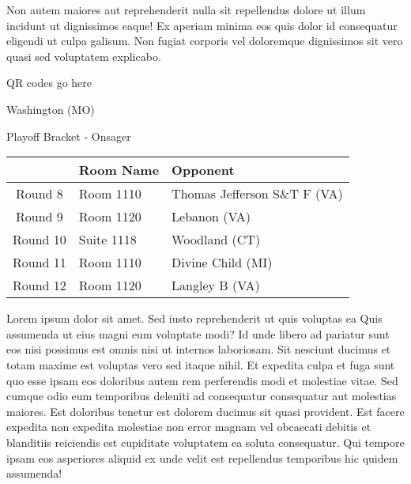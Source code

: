 \documentclass{article}%
\begin{document}
\newline%
Non autem maiores aut reprehenderit nulla sit repellendus dolore ut illum incidunt ut dignissimos eaque! Ex aperiam minima eos quis dolor id consequatur eligendi ut culpa galisum. Non fugiat corporis vel doloremque dignissimos sit vero quasi sed voluptatem explicabo.\newline%
\newline%
%
\vspace*{30pt}%
\begin{center}%
\begin{Huge}%
QR codes go here%
\end{Huge}%
\end{center}%
\newpage%
\begin{center}%
\begin{Huge}%
Washington (MO)%
\end{Huge}%
\vspace*{8pt}%
\linebreak%
\begin{Large}%
Playoff Bracket {-} Onsager%
\end{Large}%
\end{center}%
\begin{tabularx}{\textwidth}{|c|Y|Y|}%
\hline%
&Room Name&Opponent\\%
\hline%
Round 8&Room 1110&Thomas Jefferson S\&T F (VA)\\%
Round 9&Room 1120&Lebanon (VA)\\%
Round 10&Suite 1118&Woodland (CT)\\%
Round 11&Room 1110&Divine Child (MI)\\%
Round 12&Room 1120&Langley B (VA)\\%
\hline%
\end{tabularx}%
\vspace*{8pt}%
\linebreak%
\newline%
\newline%
Lorem ipsum dolor sit amet. Sed iusto reprehenderit ut quis voluptas ea Quis assumenda ut eius magni eum voluptate modi? Id unde libero ad pariatur sunt eos nisi possimus est omnis nisi ut internos laboriosam. Sit nesciunt ducimus et totam maxime est voluptas vero sed itaque nihil. Et expedita culpa et fuga sunt quo esse ipsam eos doloribus autem rem perferendis modi et molestiae vitae.\newline%
\newline%
Sed cumque odio eum temporibus deleniti ad consequatur consequatur aut molestias maiores. Est doloribus tenetur est dolorem ducimus sit quasi provident. Est facere expedita non expedita molestiae non error magnam vel obcaecati debitis et blanditiis reiciendis est cupiditate voluptatem ea soluta consequatur. Qui tempore ipsam eos asperiores aliquid ex unde velit est repellendus temporibus hic quidem assumenda!\newline%
\end{document}
